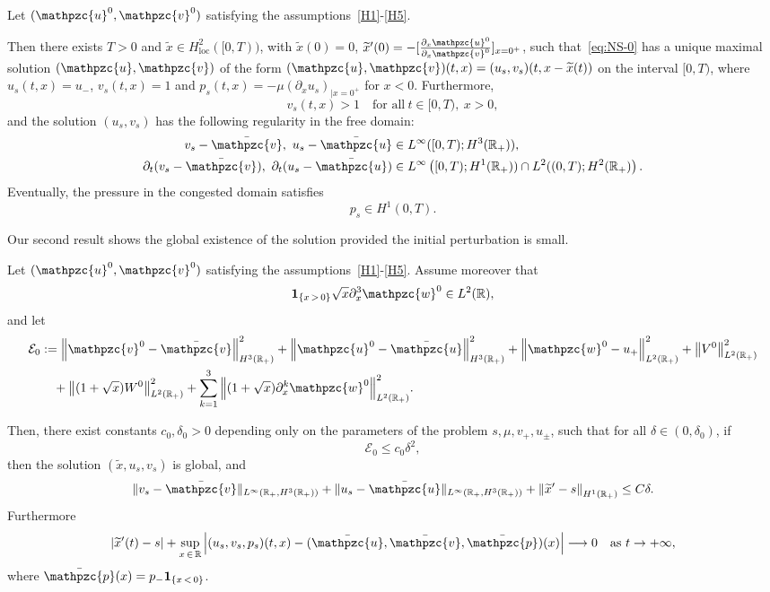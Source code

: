 \documentclass[AHL,Unicode,longabstracts,published]{cedram}
\newcommand{\R}{\mathbb{R}}
\newcommand{\p}{\partial}
\newcommand{\bv}{\bar{\mathpzc{v}}}
\newcommand{\bu}{\bar{\mathpzc{u}}}
\newcommand{\bp}{\bar{\mathpzc{p}}}
\newcommand{\bfun}{\mathbf{1}}
\newcommand{\cE}{\mathcal E}
\newcommand{\rloc}{\mathrm{loc}}
\newcommand{\tv}{\mathpzc{v}}
\newcommand{\tu}{\mathpzc{u}}
\newcommand{\tw}{\mathpzc{w}}
\newcommand{\tx}{\widetilde{x}}
\newcommand{\tx}{\widetilde{x}}
\begin{document}
\begin{theo}
Let $(\tu^0, \tv^0)$ satisfying the assumptions~\eqref{H1}-\eqref{H5}.

Then there exists $T>0$ and $\tx \in H^2_\rloc([0,T))$, with $\tx(0) = 0$, $\tx'(0) = -[\frac{\partial_x\tu^0}{\partial_x \tv^0}]_{x=0^+}$, such that~\eqref{eq:NS-0} has a unique maximal solution $(\tu,\tv)$ of the form $(\tu,\tv)(t,x)= (u_s, v_s)(t, x-\tx(t))$ on the interval $[0, T)$, where $u_s(t,x)= u_-$, $v_s(t,x)= 1$ and $p_s(t,x) = -\mu (\partial_x u_s)_{|x=0^+}$ for $x<0$. Furthermore,
\begin{equation}
v_s(t,x) > 1 \quad \text{for all}~t\in [0,T),~x > 0,
\end{equation}
and the solution $(u_s,v_s)$ has the following regularity in the free domain:
\begin{align}
v_s - \bv, \ u_s -\bu &\in L^\infty([0,T); H^3(\R_+)), \\
\partial_t(v_s -\bv),~\partial_t(u_s-\bu)
&\in L^\infty\left([0,T);H^1(\R_+)) \cap L^2((0,T); H^2(\R_+)\right).
\end{align}
Eventually, the pressure in the congested domain satisfies
\begin{equation}\label{thm:main-loc}
p_s \in H^1(0,T).
\end{equation}
\end{theo}


Our second result shows the global existence of the solution provided the initial perturbation is small.

\begin{theo}\label{thm:main-glob}
Let $(\tu^0, \tv^0)$ satisfying the assumptions~\eqref{H1}-\eqref{H5}. Assume moreover that
\begin{equation}
\bfun_{\{x\, >\,0\}} \sqrt{x} \partial^3_x \tw^0 \in L^2(\R),
\end{equation}
and let
\begin{align*}
\cE_0 & :=\left\|\tv^0 - \bv\right\|_{H^3(\R_+)}^2 + \left\|\tu^0-\bu\right\|_{H^3(\R_+)}^2 +\left\|\tw^0 - u_+\right\|_{L^2(\R_+)}^2 +\left\|V^0\right\|_{L^2(\R_+)}^2 \\
& \quad+ \left\|(1+\sqrt{x}) W^0\right\|_{L^2(\R_+)}^2+{
\sum_{k=1}^3 \left\|(1+\sqrt{x}) \p_x^k\tw^0\right\|_{L^2(\R_+)}^2}.
\end{align*}


Then, there exist constants $c_0,\delta_0 >0$ depending only on the parameters of the problem $s, \mu, v_+,u_\pm$, such that for all $\delta \in (0,\delta_0)$, if
\begin{equation}\label{hyp:small-glob}
\cE_0 \leq c_0 \delta^2,
\end{equation}
then the solution $(\tx,u_s,v_s)$ is global, and
\[
\|v_s-\bv\|_{L^\infty(\R_+, H^3(\R_+))} + \|u_s-\bu\|_{L^\infty(\R_+, H^3(\R_+))} +\left\|\tx'-s\right\|_{H^1(\R_+)}\leq C \delta.
\]
Furthermore
\begin{equation}
\left|\tx'(t) -s\right| + \sup_{x\,\in\,\R} \left|(u_s,v_s,p_s)(t,x) - (\bu, \bv,\bp)(x)\right| \longrightarrow 0 \quad \text{as}~t\to +\infty,
\end{equation}
where $\bp(x) = p_- \bfun_{\{x\,<\,0\}}$.
\end{theo}
\end{document}
